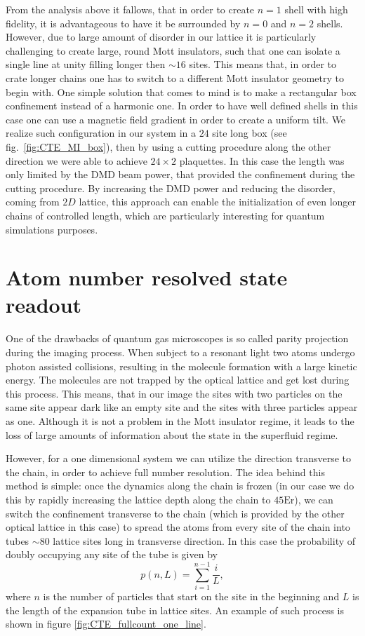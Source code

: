  From the analysis above it fallows, that in order to create $n=1$ shell with high fidelity, it is advantageous to have it be surrounded by $n=0$ and $n=2$ shells. However, due to large amount of disorder in our lattice it is particularly challenging to create large, round Mott insulators, such that one can isolate a single line at unity filling longer then $\sim 16$ sites. This means that, in order to crate longer chains one has to switch to a different Mott insulator geometry to begin with. One simple solution that comes to mind is to make a rectangular box confinement instead of a harmonic one. In order to have well defined shells in this case one can use a magnetic field gradient in order to create a uniform tilt. We realize such configuration in our system in a $24$ site long box (see fig.~\ref{fig:CTE_MI_box}), then by using a cutting procedure along the other direction we were able to achieve $24\times 2$ plaquettes. In this case the length was only limited by the DMD beam power, that provided the confinement during the cutting procedure. By increasing the DMD power and reducing the disorder, coming from $2D$ lattice, this approach can enable the initialization of even longer chains of controlled length, which are particularly interesting for quantum simulations purposes.
 
 \section{Atom number resolved state readout}
 
 One of the drawbacks of quantum gas microscopes is so called parity projection during the imaging process. When subject to a resonant light two atoms undergo photon assisted collisions, resulting in the molecule formation with a large kinetic energy. The molecules are not trapped by the optical lattice and get lost during this process. This means, that in our image the sites with two particles on the same site appear dark like an empty site and the sites with three particles appear as one. Although it is not a problem in the Mott insulator regime, it leads to the loss of large amounts of information about the state in the superfluid regime. 
 
 However, for a one dimensional system we can utilize the direction transverse to the chain, in order to achieve full number resolution. The idea behind this method is simple: once the dynamics along the chain is frozen (in our case we do this by rapidly increasing the lattice depth along the chain to $45 \textrm{Er}$), we can switch the confinement transverse to the chain (which is provided by the other optical lattice in this case) to spread the atoms from every site of the chain into tubes $\sim 80$ lattice sites long in transverse direction. In this case the probability of doubly occupying any site of the tube is given by
 \begin{equation}
 p(n,L) = \sum_{i=1}^{n-1}\frac{i}{L},
 \end{equation}
 where $n$ is the number of particles that start on the site in the beginning and $L$ is the length of the expansion tube in lattice sites. An example of such process is shown in figure \ref{fig:CTE_fullcount_one_line}.
 
